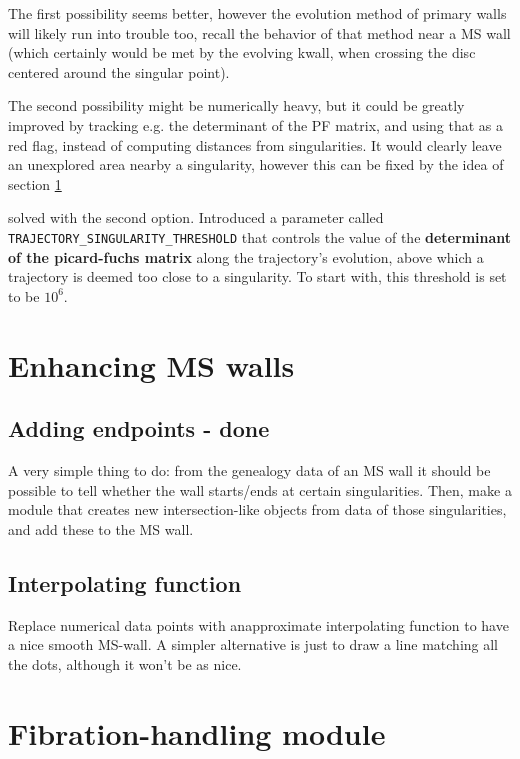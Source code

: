 \documentclass[11pt]{report}
\begin{document}
The first possibility seems better, however the evolution method of primary walls will likely run into trouble too, recall the behavior of that method near a MS wall (which certainly would be met by the evolving kwall, when crossing the disc centered around the singular point).


The second possibility might be numerically heavy, but it could be greatly improved by tracking e.g. the determinant of the PF matrix, and using that as a red flag, instead of computing distances from singularities. It would clearly leave an unexplored area nearby a singularity, however this can be fixed by the idea of section \ref{sec:bp-to-int}

\bigskip

{\color{blue}  solved with the second option. Introduced a parameter called {\tt{TRAJECTORY\_SINGULARITY\_THRESHOLD}} that controls the value of the {\bf determinant of the picard-fuchs matrix} along the trajectory's evolution, above which a trajectory is deemed too close to a singularity. To start with, this threshold is set to be $10^{6}$.}



\section{Enhancing MS walls}\label{sec:bp-to-int}
\subsection{Adding endpoints  - {\color{red} \bf done}}
A very simple thing to do: from the genealogy data of an MS wall it should be possible to tell whether the wall starts/ends at certain singularities. Then, make a module that creates new intersection-like objects from data of those singularities, and add these to the MS wall. 

\subsection{Interpolating function}
Replace numerical data points with anapproximate interpolating function to have a nice smooth MS-wall. A simpler alternative is just to draw a line matching all the dots, although it won't be as nice.




\section{Fibration-handling module}
\end{document}
